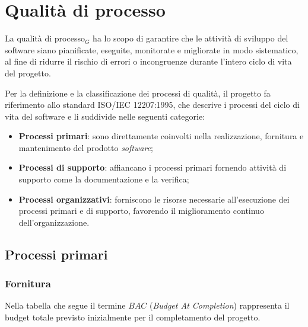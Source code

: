 \documentclass[10pt, letterpaper]{article}
\begin{document}
\section{Qualità di processo}
La qualità di processo${_G}$ ha lo scopo di garantire che le attività di sviluppo
del software siano pianificate, eseguite, monitorate e migliorate in modo
sistematico, al fine di ridurre il rischio di errori o incongruenze
durante l'intero ciclo di vita del progetto.

Per la definizione e la classificazione dei processi di qualità, il progetto
fa riferimento allo standard ISO/IEC 12207:1995, che descrive i processi
del ciclo di vita del software e li suddivide nelle seguenti categorie:
\begin{itemize}
    \item \textbf{Processi primari}: sono direttamente coinvolti nella
          realizzazione, fornitura e mantenimento del prodotto \textit{software};
    \item \textbf{Processi di supporto}: affiancano i processi primari fornendo
          attività di supporto come la documentazione e la verifica;
    \item \textbf{Processi organizzativi}: forniscono le risorse necessarie
          all'esecuzione dei processi primari e di supporto, favorendo il
          miglioramento continuo dell'organizzazione.
\end{itemize}
\subsection{Processi primari}
\subsubsection{Fornitura}
Nella tabella che segue il termine $BAC$ (\textit{Budget At Completion})
rappresenta il budget totale previsto inizialmente per il completamento
del progetto.
\begin{table}[H]
    \caption{Tabella dei valori soglia per metriche di fornitura}
\end{table}
\end{document}
